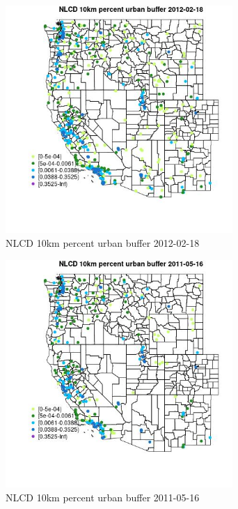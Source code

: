 \begin{figure} 
\centering  
\includegraphics[width=0.77\textwidth]{Code_Outputs/Report_ML_input_PM25_Step4_part_f_de_duplicated_aves_prioritize_24hr_obswNAs_MapObsNLCD_10km_percent_urban_buffer2012-02-18.jpg} 
\caption{\label{fig:Report_ML_input_PM25_Step4_part_f_de_duplicated_aves_prioritize_24hr_obswNAsMapObsNLCD_10km_percent_urban_buffer2012-02-18}NLCD 10km percent urban buffer 2012-02-18} 
\end{figure} 
 

\begin{figure} 
\centering  
\includegraphics[width=0.77\textwidth]{Code_Outputs/Report_ML_input_PM25_Step4_part_f_de_duplicated_aves_prioritize_24hr_obswNAs_MapObsNLCD_10km_percent_urban_buffer2011-05-16.jpg} 
\caption{\label{fig:Report_ML_input_PM25_Step4_part_f_de_duplicated_aves_prioritize_24hr_obswNAsMapObsNLCD_10km_percent_urban_buffer2011-05-16}NLCD 10km percent urban buffer 2011-05-16} 
\end{figure} 
 

